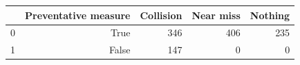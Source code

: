 \begin{tabular}{lrrrr}
\toprule
 & Preventative measure & Collision & Near miss & Nothing \\
\midrule
0 & True & 346 & 406 & 235 \\
1 & False & 147 & 0 & 0 \\
\bottomrule
\end{tabular}

